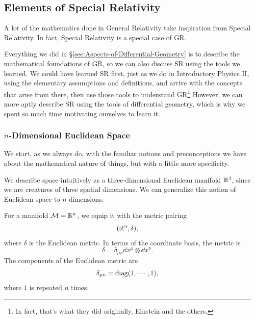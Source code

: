 

\subsection{Elements of Special Relativity}
	A lot of the mathematics done in General Relativity take 
	inspiration from Special Relativity.
	In fact, Special Relativity is a special case of GR.

	Everything we did in \S \ref{sec:Aspects-of-Differential-Geometry}
	is to describe the mathematical foundations of GR, so we can 
	also discuss SR using the tools we learned. We could have learned
	SR first, just as we do in Introductory Physics II, using the 
	elementary assumptions and definitions, and arrive with the 
	concepts that arise from there, then use those tools to understand
	GR\footnote{In fact, that's what they did originally, Einstein and the others.}
	However, we can more aptly describe SR using the tools of differential geometry,
	which is why we spent so much time motivating ourselves to learn it.

	\subsubsection{$n$-Dimensional Euclidean Space}
		We start, as we always do, with the familiar notions and preconceptions
		we have about the mathematical nature of things, but with a little more specificity.

		We describe space intuitively as a three-dimensional Euclidean manifold
		$\mathbb{R}^3$, since we are creatures of three spatial dimensions. We can
		generalize this notion of Euclidean space to $n$ dimensions.

		For a manifold $\mathcal M = \mathbb{R}^n$, we equip it with the metric pairing
		\[
			(\mathbb{R}^n,\delta),
		\]
		where $\delta$ is the Euclidean metric. In terms of the coordinate basis,
		the metric is
		\begin{equation}
			\label{eq:euclidean-metric}
			\delta
			=
			\delta_{\mu\nu}
			\dd{x^\mu}
			\otimes
			\dd{x^\nu}.
		\end{equation}
		The components of the Euclidean metric are
		\[
			\delta_{\mu\nu}
			=
			\operatorname{diag}(1,\cdots,1),
		\]
		where $1$ is repeated $n$ times.

